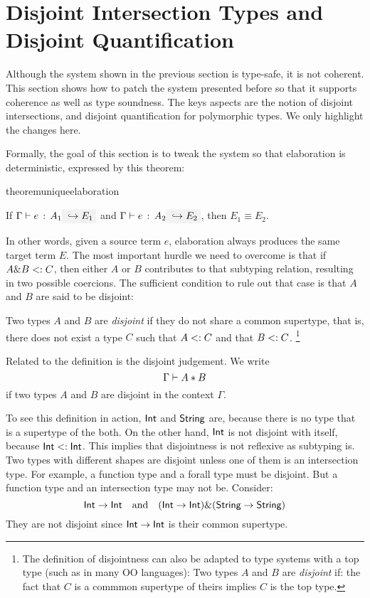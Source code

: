 \section{Disjoint Intersection Types and Disjoint Quantification}
\label{sec:disjoint}

Although the system shown in the previous section is type-safe, it is not
coherent. This section shows how to patch the system presented before so that it
supports coherence as well as type soundness. The keys aspects are the notion of
disjoint intersections, and disjoint quantification for polymorphic types. We
only highlight the changes here.

Formally, the goal of this section is to tweak the system so that elaboration is deterministic, expressed by this theorem:
\begin{restatable}{theorem}{uniqueelaboration}
  \label{theorem:unique-elaboration}

  If $\jtype \Gamma e {A_1} \yields {E_1}$ and $\jtype \Gamma e {A_2}
  \yields {E_2}$, then $E_1 \equiv E_2$.
\end{restatable}
In other words, given a source term $e$, elaboration always produces the same
target term $E$. The most important hurdle we need to overcome is that if $A \& B <: C$, then either $A$ or $B$ contributes to that subtyping
relation, resulting in two possible coercions. The sufficient condition to rule out that case is that $A$ and $B$ are said to be disjoint:
\begin{definition}
  Two types $A$ and $B$ are \emph{disjoint} if they do not share a common
  supertype, that is, there does not exist a type $C$ such that $A <: C$
  and that $B <: C$. \footnote{
  The definition of disjointness can also be adapted to type systems with a top
  type (such as \lstinline@Object@ in many OO languages): Two types $A$ and $B$
  are \emph{disjoint} if: the fact that $C$ is a commmon supertype of theirs
  implies $C$ is the top type.
  }
\end{definition}

Related to the definition is the disjoint judgement. We write
\[ \Gamma \vdash A * B \]
if two types $A$ and $B$ are disjoint in the context $\Gamma$.

To see this definition in action, $\textsf{Int}$ and $\textsf{String}$ are, because there is
no type that is a supertype of the both. On the other hand, $\textsf{Int}$ is not
disjoint with itself, because $\textsf{Int} <: \textsf{Int}$. This implies that
disjointness is not reflexive as subtyping is. Two types with different shapes
are disjoint unless one of them is an intersection type. For example, a function
type and a forall type must be disjoint. But a function type and an intersection
type may not be. Consider:
\[ \textsf{Int} \to \textsf{Int} \quad \text{and} \quad (\textsf{Int} \to \textsf{Int}) \& (\textsf{String} \to \textsf{String}) \]
They are not disjoint since $\textsf{Int} \to \textsf{Int}$ is their common supertype.

